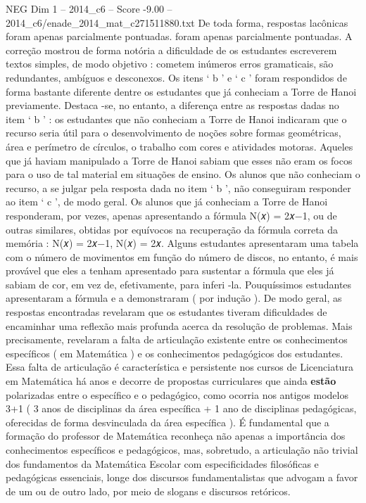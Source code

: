 \begin{textsample}{NEG Dim 1 – 2014\_c6 – Score -9.00 – 2014\_c6/enade\_2014\_mat\_c271511880.txt}
De toda forma, respostas lacônicas foram apenas parcialmente pontuadas. foram apenas parcialmente pontuadas.
A correção mostrou de forma notória a dificuldade de os estudantes escreverem textos simples, de modo objetivo : cometem inúmeros erros gramaticais, são redundantes, ambíguos e desconexos.
Os itens ‘ b ’ e ‘ c ’ foram respondidos de forma bastante diferente dentre os estudantes que já conheciam a Torre de Hanoi previamente.
Destaca -se, no entanto, a diferença entre as respostas dadas no item ‘ b ’ : os estudantes que não conheciam a Torre de Hanoi indicaram que o recurso seria útil para o desenvolvimento de noções sobre formas geométricas, área e perímetro de círculos, o trabalho com cores e atividades motoras.
Aqueles que já haviam manipulado a Torre de Hanoi sabiam que esses não eram os focos para o uso de tal material em situações de ensino.
Os alunos que não conheciam o recurso, a se julgar pela resposta dada no item ‘ b ’, não conseguiram responder ao item ‘ c ’, de modo geral.
Os alunos que já conheciam a Torre de Hanoi responderam, por vezes, apenas apresentando a fórmula N(𝑥) = 2𝑥−1, ou de outras similares, obtidas por equívocos na recuperação da fórmula correta da memória : N(𝑥) = 2𝑥−1, N(𝑥) = 2𝑥.
Alguns estudantes apresentaram uma tabela com o número de movimentos em função do número de discos, no entanto, é mais provável que eles a tenham apresentado para sustentar a fórmula que eles já sabiam de cor, em vez de, efetivamente, para inferi -la.
Pouquíssimos estudantes apresentaram a fórmula e a demonstraram ( por indução ).
De modo geral, as respostas encontradas revelaram que os estudantes tiveram dificuldades de encaminhar uma reflexão mais profunda acerca da resolução de problemas.
Mais precisamente, revelaram a falta de articulação existente entre os conhecimentos específicos ( em Matemática ) e os conhecimentos pedagógicos dos estudantes.
Essa falta de articulação é característica e persistente nos cursos de Licenciatura em Matemática há anos e decorre de propostas curriculares que ainda \textbf{estão} polarizadas entre o específico e o pedagógico, como ocorria nos antigos modelos 3+1 ( 3 anos de disciplinas da área específica + 1 ano de disciplinas pedagógicas, oferecidas de forma desvinculada da área específica ).
É fundamental que a formação do professor de Matemática reconheça não apenas a importância dos conhecimentos específicos e pedagógicos, mas, sobretudo, a articulação não trivial dos fundamentos da Matemática Escolar com especificidades filosóficas e pedagógicas essenciais, longe dos discursos fundamentalistas que advogam a favor de um ou de outro lado, por meio de slogans e discursos retóricos.

\end{textsample}
